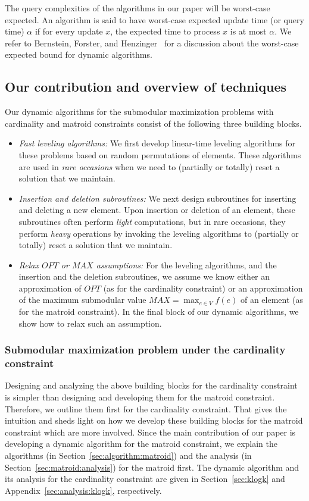 \documentclass[11pt]{article}
\begin{document}
The query complexities of the algorithms in our paper will be worst-case expected.
An algorithm is said to have worst-case expected update time (or query time) $\alpha$ 
if for every update $x$, the expected time to process $x$ is at most $\alpha$. 
We refer to Bernstein, Forster, and Henzinger~\cite{DBLP:journals/talg/BernsteinFH21} 
for a discussion about the worst-case expected bound for dynamic algorithms.

\subsection{Our contribution and overview of techniques}
\label{sec:contrib}
Our dynamic algorithms for the submodular maximization problems with cardinality and matroid constraints 
consist of the following three building blocks. 
\begin{itemize}
    \item \emph{Fast leveling algorithms:} We first develop linear-time leveling algorithms 
    for these problems based on random permutations of elements.  
    These algorithms are used in \emph{rare occasions} when we need to (partially or totally) reset a solution that we maintain.  
    \item \emph{Insertion and deletion subroutines:} We next design subroutines for inserting and deleting a new element. 
    Upon insertion or deletion of an element, these subroutines often perform \emph{light} computations, but in rare occasions, 
    they perform \emph{heavy} operations by invoking the leveling algorithms to (partially or totally) reset a solution that we maintain. 
    \item \emph{Relax $OPT$ or $MAX$ assumptions:} For the leveling algorithms, and the insertion and the deletion subroutines, 
    we assume we know either an approximation of $OPT$ (as for the cardinality constraint) or 
    an approximation of the maximum submodular value $MAX = \max_{e \in V} f(e)$ of an element (as for the matroid constraint). 
    In the final block of our dynamic algorithms, we show how to relax such an assumption. 
\end{itemize}



\subsubsection{Submodular maximization problem  under the cardinality constraint} 
Designing and analyzing the above building blocks for the cardinality constraint is simpler than 
designing and developing them for the matroid constraint. 
Therefore, we outline them first for the cardinality constraint. 
That gives the intuition and sheds light on how we develop these building blocks for the matroid constraint 
which are more involved. 
Since the main contribution of our paper is developing a dynamic algorithm for the matroid constraint, 
we explain the algorithms (in Section~\ref{sec:algorithm:matroid}) and the analysis (in Section~\ref{sec:matroid:analysis}) for the matroid first. 
The dynamic algorithm and its analysis for the cardinality constraint are given in Section~\ref{sec:klogk} and Appendix~\ref{sec:analysis:klogk}, respectively. 
\end{document}
